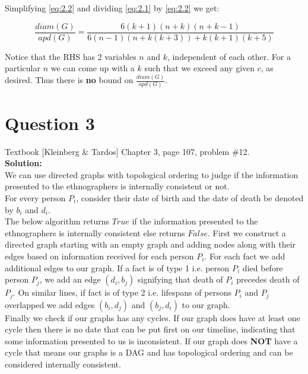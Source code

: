 \documentclass[11pt]{article}
\begin{document}
Simplifying \ref{eq:2.2} and dividing \ref{eq:2.1} by \ref{eq:2.2} we get:

\begin{equation*}
	\frac{diam(G)}{apd(G)} = \frac{6(k+1)(n+k)(n+k-1)}{6(n-1)(n+k(k+3)) + k(k+1)(k+5)}
\end{equation*}

Notice that the RHS has 2 variables $ n $ and $ k $, independent of each other. For a particular $ n $ we can come up with a $ k $ such that we exceed any given $ c $, as desired. Thus there is \textbf{no} bound on $ \frac{diam(G)}{apd(G)} $.
\clearpage
\section{Question 3} Textbook [Kleinberg \& Tardos] Chapter 3, page 107, problem \#12. \\
\textbf{Solution:} \\

We can use directed graphs with topological ordering to judge if the information presented to the ethnographers is internally consistent or not. \\

For every person $ P_i $, consider their date of birth and the date of death be denoted by $ b_i $ and $ d_i $. \\

The below algorithm returns $ True $ if the information presented to the ethnographers is internally consistent else returns $ False $. First we construct a directed graph starting with an empty graph and adding nodes along with their edges based on information received for each person $ P_i $. For each fact we add additional edges to our graph. If a fact is of type 1 i.e. person $P_i$ died before person $ P_j $, we add an edge $ (d_i, b_j) $ signifying that death of $ P_i $ precedes death of $ P_j $. On similar lines, if fact is of type 2 i.e. lifespans of persons $ P_i $ and $ P_j $ overlapped we add edges $ (b_i, d_j) $ and $ (b_j, d_i) $ to our graph. \\ 

Finally we check if our graphs has any cycles. If our graph does have at least one cycle then there is no date that can be put first on our timeline, indicating that some information presented to us is inconsistent. If our graph does \textbf{NOT} have a cycle that means our graphs is a DAG and has topological ordering and can be considered internally consistent.
\end{document}
